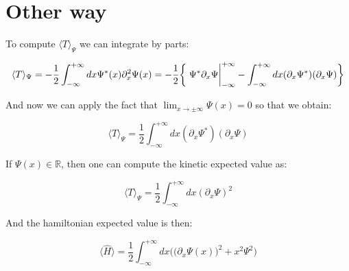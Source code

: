 \documentclass{book}
\begin{document}
\section{Other way}

To compute $\langle T\rangle_\Psi$ we can integrate by parts:

\[\langle T\rangle_\Psi=-\frac{1}{2}\int^{+\infty}_{-\infty} dx \Psi^*(x)\partial_x^2\Psi(x) =-\frac{1}{2}\bigg\{ \eval{\Psi^*\partial_x \Psi}_{-\infty}^{+\infty}-\int_{-\infty}^{+\infty}dx(\partial_x\Psi^*)(\partial_x\Psi)\bigg\}\]

And now we can apply the fact that $\displaystyle\lim_{x\to\pm\infty}\Psi(x)=0$ so that we obtain:

\[\langle T\rangle_\Psi=\frac{1}{2}\int_{-\infty}^{+\infty}dx(\partial_x\Psi^*)(\partial_x\Psi)\]


If $\Psi(x)\in\mathbb{R}$, then one can compute the kinetic expected value as:

\[\langle T\rangle_\Psi=\frac{1}{2}\int_{-\infty}^{+\infty}dx(\partial_x\Psi)^2\]

And the hamiltonian expected value is then:

\[\langle\hat{H}\rangle=\frac{1}{2}\int_{-\infty}^{+\infty}dx\bigg(\big(\partial_x\Psi(x)\big)^2+x^2\Psi^2\bigg)\]
\end{document}
